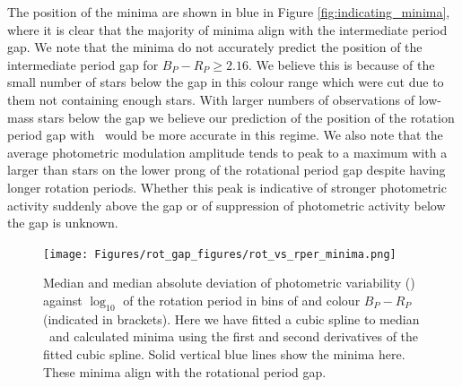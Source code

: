 The position of the minima are shown in blue in Figure \ref{fig:indicating_minima}, where it is clear that the majority of minima align with the intermediate period gap.
We note that the minima do not accurately predict the position of the intermediate period gap for $B_P-R_P \geq 2.16$.
We believe this is because of the small number of stars below the gap in this colour range which were cut due to them not containing enough stars.
 With larger numbers of observations of low-mass stars below the gap we believe our prediction of the position of the rotation period gap with \rper{} \ would be more accurate in this regime. 
We also note that the average photometric modulation amplitude tends to peak to a maximum with a larger \rper{} than stars on the lower prong of the rotational period gap despite having longer rotation periods.
Whether this peak is indicative of stronger photometric activity suddenly above the gap or of suppression of photometric activity below the gap is unknown.

\begin{figure}
\centering
  \texttt{[image: Figures/rot\_gap\_figures/rot\_vs\_rper\_minima.png]}
  \caption[Median and median absolute deviation of photometric variability (\rper{}) against $\log_{10}$ of the rotation period in bins of and colour \gaia{} $B_P-R_P$.]{
  Median and median absolute deviation of photometric variability (\rper{}) against $\log_{10}$ of the rotation period in bins of and colour \gaia{} $B_P-R_P$ (indicated in brackets). Here we have fitted a cubic spline to median \rper{} \ and calculated minima using the first and second derivatives of the fitted cubic spline. Solid vertical blue lines show the minima here. These minima align with the rotational period gap.}
  \label{fig:binned_rper_scatter}
\end{figure}

